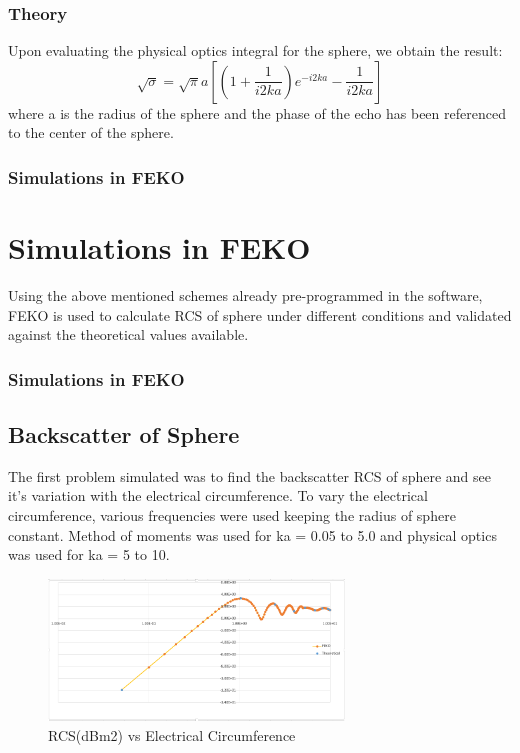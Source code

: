 \documentclass{beamer}
\begin{document}
\begin{frame}
\frametitle{Theory}
Upon evaluating the physical optics integral for the sphere, we obtain the result:
\begin{equation}
\sqrt{\sigma} = \sqrt{\pi}a[(1 + \frac{1}{i2ka})e^{-i2ka} - \frac{1}{i2ka}]
\end{equation}
where a is the radius of the sphere and the phase of the echo has been referenced to the center of the sphere. 
\end{frame}
\begin{frame}
\frametitle{Simulations in FEKO}
\section{Simulations in FEKO}
Using the above mentioned schemes already pre-programmed in the software, FEKO is used to calculate RCS of sphere under different conditions and validated against the theoretical values available.
\end{frame}
\begin{frame}
\frametitle{Simulations in FEKO}
\subsection{Backscatter of Sphere}
The first problem simulated was to find the backscatter RCS of sphere and see it's variation with the electrical circumference. To vary the electrical circumference, various frequencies were used keeping the radius of sphere constant. Method of moments was used for ka = 0.05 to 5.0 and physical optics was used for ka = 5 to 10. 
\begin{figure}[H]
\centering
\includegraphics[width = 0.7\textwidth]{backscatter.PNG}
\caption{RCS(dBm2) vs Electrical Circumference}
\end{figure}
\end{frame}
\end{document}
